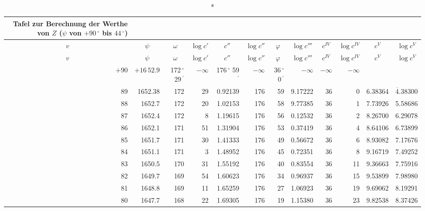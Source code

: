 \documentclass[12pt,a4paper]{article}
\newcommand{\Grad}{\,^\circ}
\newcommand{\Min}{\,^\prime}
\begin{document}
\begin{small}
\noindent\begin{longtable}{@{}rr|rr|rr|rr|rr|rr@{}}
\caption*{Tafel zur Berechnung der Werthe von $Z$ ($\psi$ von $+90\Grad$ bis $44\Grad$)}\\
\toprule
\multicolumn{1}{c}{$v$} & \multicolumn{1}{c}{$\psi$} &
\multicolumn{1}{c}{$\omega$} & \multicolumn{1}{c}{$\log c'$} &
\multicolumn{1}{c}{$c''$} & \multicolumn{1}{c}{$\log c''$} &
\multicolumn{1}{c}{$\varphi$} & \multicolumn{1}{c}{$\log c'''$} &
\multicolumn{1}{c}{$c^{IV}$} & \multicolumn{1}{c}{$\log c^{IV}$} &
\multicolumn{1}{c}{$c^{V}$} & \multicolumn{1}{c}{$\log c^{V}$} \\
\midrule
\endfirsthead
\toprule
\multicolumn{1}{c}{$v$} & \multicolumn{1}{c}{$\psi$} &
\multicolumn{1}{c}{$\omega$} & \multicolumn{1}{c}{$\log c'$} &
\multicolumn{1}{c}{$c''$} & \multicolumn{1}{c}{$\log c''$} &
\multicolumn{1}{c}{$\varphi$} & \multicolumn{1}{c}{$\log c'''$} &
\multicolumn{1}{c}{$c^{IV}$} & \multicolumn{1}{c}{$\log c^{IV}$} &
\multicolumn{1}{c}{$c^{V}$} & \multicolumn{1}{c}{$\log c^{V}$} \\
\midrule
\endhead
\bottomrule
\endfoot
$+90$ & $+16\,52.9$ & 172$\Grad$ 29$\Min$ & $-\infty$ & 176$\Grad$ 59$\Min$ & $-\infty$ & 36$\Grad$ 0$\Min$ & $-\infty$ & $-\infty$ & $-\infty$ \\
89 & 1652.38 & 172 & 29 & 0.92139 & 176 & 59 & 9.17222 & 36 & 0 & 6.38364 & $\overline{4}.38300$ \\
88 & 1652.7 & 172 & 20 & 1.02153 & 176 & 58 & 9.77385 & 36 & 1 & 7.73926 & 5.58686 \\
87 & 1652.4 & 172 & 8 & 1.19615 & 176 & 56 & 0.12532 & 36 & 2 & 8.26700 & 6.29078 \\
86 & 1652.1 & 171 & 51 & 1.31904 & 176 & 53 & 0.37419 & 36 & 4 & 8.64106 & 6.73899 \\
85 & 1651.7 & 171 & 30 & 1.41333 & 176 & 49 & 0.56672 & 36 & 6 & 8.93082 & 7.17676 \\
84 & 1651.1 & 171 & 3 & 1.48952 & 176 & 45 & 0.72351 & 36 & 8 & 9.16719 & 7.49252 \\
83 & 1650.5 & 170 & 31 & 1.55192 & 176 & 40 & 0.83554 & 36 & 11 & 9.36663 & 7.75916 \\
82 & 1649.7 & 169 & 54 & 1.60623 & 176 & 34 & 0.96937 & 36 & 15 & 9.53899 & 7.98980 \\
81 & 1648.8 & 169 & 11 & 1.65259 & 176 & 27 & 1.06923 & 36 & 19 & 9.69062 & 8.19291 \\
80 & 1647.7 & 168 & 22 & 1.69305 & 176 & 19 & 1.15380 & 36 & 23 & 9.82538 & 8.37426 \\

\end{longtable}
\end{small}
\end{document}
